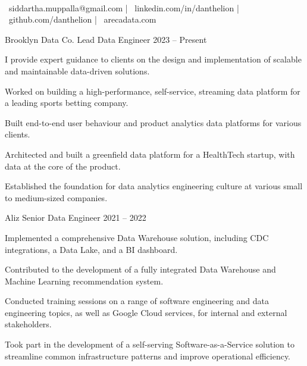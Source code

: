 \documentclass[]{awesome-cv}
\begin{document}
\begin{center}
	  \\
	\vspace{2mm}
	{\faEnvelope\ siddartha.muppalla@gmail.com} | {\faLinkedin\ linkedin.com/in/danthelion} | {\faGithub\ github.com/danthelion} | {\faLink\ arecadata.com}
\end{center}
\begin{cventries}
	\cventry
	{Brooklyn Data Co.}
	{Lead Data Engineer}
	{2023 – Present}
	{}
	{\begin{cvitems}
		\item {I provide expert guidance to clients on the design and implementation of scalable and maintainable data-driven solutions.}
		\item {Worked on building a high-performance, self-service, streaming data platform for a leading sports betting company.}
		\item {Built end-to-end user behaviour and product analytics data platforms for various clients.}
		\item {Architected and built a greenfield data platform for a HealthTech startup, with data at the core of the product.}
		\item {Established the foundation for data analytics engineering culture at various small to medium-sized companies.}
		\end{cvitems}}
	\cventry
	{Aliz}
	{Senior Data Engineer}
	{2021 – 2022}
	{}
	{\begin{cvitems}
		\item {Implemented a comprehensive Data Warehouse solution, including CDC integrations, a Data Lake, and a BI dashboard.}
		\item {Contributed to the development of a fully integrated Data Warehouse and Machine Learning recommendation system.}
		\item {Conducted training sessions on a range of software engineering and data engineering topics, as well as Google Cloud services, for internal and external stakeholders.}
		\item {Took part in the development of a self-serving Software-as-a-Service solution to streamline common infrastructure patterns and improve operational efficiency.}
		\end{cvitems}}

\end{cventries}
\end{document}
